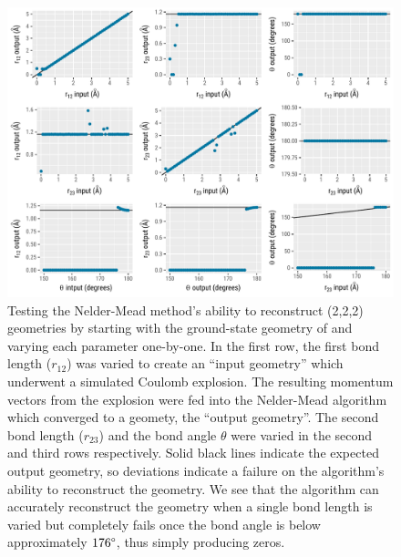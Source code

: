 \begin{figure}
  \centering
  \includegraphics[width=\textwidth]{Plots/CO2SimplexCalibrationPlots}
  \caption[Testing the Nelder-Mead method's ability to reconstruct  (2,2,2) geometries]
  {Testing the Nelder-Mead method's ability to reconstruct  (2,2,2) geometries by starting with the ground-state geometry of  and varying each parameter one-by-one. In the first row, the first  bond length ($r_{12}$) was varied to create an ``input geometry'' which underwent a simulated Coulomb explosion. The resulting momentum vectors from the explosion were fed into the Nelder-Mead algorithm which converged to a geomety, the ``output geometry''. The second  bond length ($r_{23}$) and the bond angle $\theta$ were varied in the second and third rows respectively. Solid black lines indicate the expected output geometry, so deviations indicate a failure on the algorithm's ability to reconstruct the geometry. We see that the algorithm can accurately reconstruct the geometry when a single bond length is varied but completely fails once the bond angle is below approximately $176\degree$, thus simply producing zeros.}
  \label{fig:CO2SimplexCalibrationPlots}
\end{figure}

